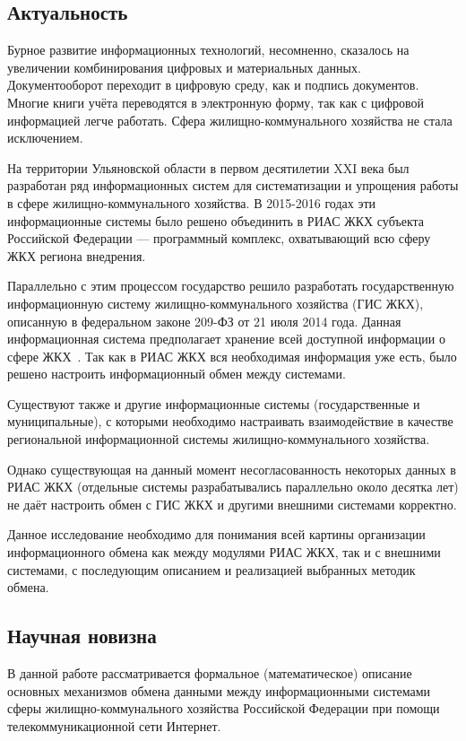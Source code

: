 \subsection*{Актуальность}

Бурное развитие информационных технологий, несомненно, сказалось на увеличении комбинирования цифровых и материальных данных.
Документооборот переходит в цифровую среду, как и подпись документов.
Многие книги учёта переводятся в электронную форму, так как с цифровой информацией легче работать.
Сфера жилищно-коммунального хозяйства не стала исключением.

На территории Ульяновской области в первом десятилетии XXI века был разработан ряд информационных систем для систематизации и упрощения работы в сфере жилищно-коммунального хозяйства.
В 2015-2016 годах эти информационные системы было решено объединить в РИАС ЖКХ субъекта Российской Федерации --- программный комплекс, охватывающий всю сферу ЖКХ региона внедрения.

Параллельно с этим процессом государство решило разработать государственную информационную систему жилищно-коммунального хозяйства (ГИС ЖКХ), описанную в федеральном законе 209-ФЗ от 21 июля 2014 года.
Данная информационная система предполагает хранение всей доступной информации о сфере ЖКХ~\cite{fz209}. Так как в РИАС ЖКХ вся необходимая информация уже есть, было решено настроить информационный обмен между системами.

Существуют также и другие информационные системы (государственные и муниципальные), с которыми необходимо настраивать взаимодействие в качестве региональной информационной системы жилищно-коммунального хозяйства.

Однако существующая на данный момент несогласованность некоторых данных в РИАС ЖКХ (отдельные системы разрабатывались параллельно около десятка лет) не даёт настроить обмен с ГИС ЖКХ и другими внешними системами корректно.

Данное исследование необходимо для понимания всей картины организации информационного обмена как между модулями РИАС ЖКХ, так и с внешними системами, с последующим описанием и реализацией выбранных методик обмена.

\subsection*{Научная новизна}

В данной работе рассматривается формальное (математическое) описание основных механизмов обмена данными между информационными системами сферы жилищно-коммунального хозяйства Российской Федерации при помощи телекоммуникационной сети Интернет.

